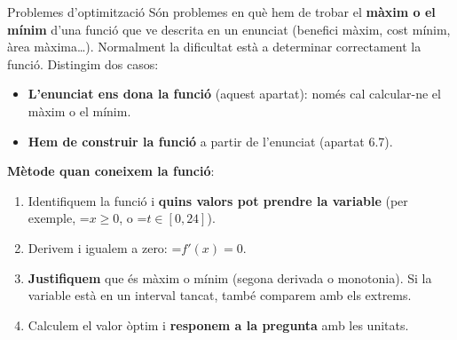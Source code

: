 \documentclass[11pt,a4paper]{article}
\newcommand{\fmm}[1]{\setbox0=\hbox{$#1$}\ifdim\wd0>\linewidth\[#1\]\else\mbox{\box0}\fi}
\newcommand{\fmuline}[1]{\textbf{\color{fmaccent}#1}}
\begin{document}
  
\begin{fmdef}{Problemes d'optimització}
Són problemes en què hem de trobar el \textbf{màxim o el mínim} d'una funció que ve descrita en un enunciat (benefici màxim, cost mínim, àrea màxima\dots{}). Normalment la dificultat està a determinar correctament la funció. Distingim dos casos:

      
\begin{itemize}
\item \textbf{L'enunciat ens dona la funció} (aquest apartat): només cal calcular-ne el màxim o el mínim.
\item \textbf{Hem de construir la funció} a partir de l'enunciat (apartat 6.7).
\end{itemize}

      

\fmuline{Mètode quan coneixem la funció}:

      
\begin{enumerate}
\item Identifiquem la funció i \textbf{quins valors pot prendre la variable} (per exemple, \fmm{x\geq0}, o \fmm{t\in[0,24]}).
\item Derivem i igualem a zero: \fmm{f'(x)=0}.
\item \textbf{Justifiquem} que és màxim o mínim (segona derivada o monotonia). Si la variable està en un interval tancat, també comparem amb els extrems.
\item Calculem el valor òptim i \textbf{responem a la pregunta} amb les unitats.
\end{enumerate}
\end{fmdef}
\end{document}
